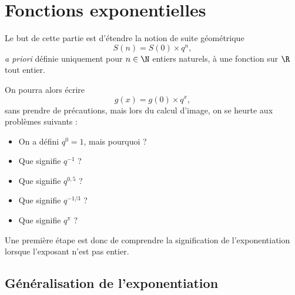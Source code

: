 
\section{Fonctions exponentielles}

Le but de cette partie est d'étendre la notion de suite géométrique
	\[ S(n) = S(0) \times q^n, \]
\emph{a priori} définie uniquement pour $n\in\N$ entiers naturels, à une fonction sur $\R$ tout entier.

On pourra alors écrire
	\[ g(x) = g(0) \times q^x, \]
sans prendre de précautions, mais lors du calcul d'image, on se heurte aux problèmes suivants :
	\begin{itemize}
		\item On a défini $q^0 = 1$, mais pourquoi ?
		\item Que signifie $q^{-1}$ ?
		\item Que signifie $q^{0,5}$ ?
		\item Que signifie $q^{-1/3}$ ?
		\item Que signifie $q^{\pi}$ ?
	\end{itemize}
Une première étape est donc de comprendre la signification de l'exponentiation lorsque l'exposant n'est pas entier.

\subsection{Généralisation de l'exponentiation}





